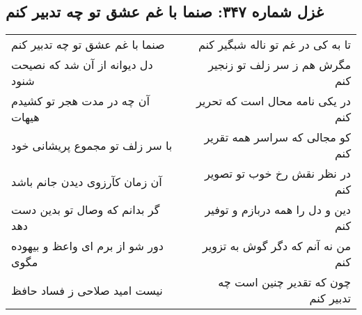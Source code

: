\begin{center}
\section*{غزل شماره ۳۴۷: صنما با غم عشق تو چه تدبیر کنم}
\label{sec:sh347}
\begin{longtable}{l p{0.5cm} r}
صنما با غم عشق تو چه تدبیر کنم
&&
تا به کی در غم تو ناله شبگیر کنم
\\
دل دیوانه از آن شد که نصیحت شنود
&&
مگرش هم ز سر زلف تو زنجیر کنم
\\
آن چه در مدت هجر تو کشیدم هیهات
&&
در یکی نامه محال است که تحریر کنم
\\
با سر زلف تو مجموع پریشانی خود
&&
کو مجالی که سراسر همه تقریر کنم
\\
آن زمان کآرزوی دیدن جانم باشد
&&
در نظر نقش رخ خوب تو تصویر کنم
\\
گر بدانم که وصال تو بدین دست دهد
&&
دین و دل را همه دربازم و توفیر کنم
\\
دور شو از برم ای واعظ و بیهوده مگوی
&&
من نه آنم که دگر گوش به تزویر کنم
\\
نیست امید صلاحی ز فساد حافظ
&&
چون که تقدیر چنین است چه تدبیر کنم
\\
\end{longtable}
\end{center}
